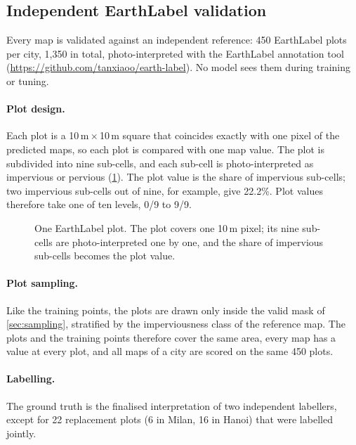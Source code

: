 \subsection{Independent EarthLabel validation}
\label{sec:validation}

Every map is validated against an independent reference: 450 EarthLabel
plots per city, 1{,}350 in total, photo-interpreted with the EarthLabel
annotation tool (\url{https://github.com/tanxiaoo/earth-label}). No model
sees them during training or tuning.

\paragraph{Plot design.} Each plot is a 10\,m\,$\times$\,10\,m square that
coincides exactly with one pixel of the predicted maps, so each plot is
compared with one map value. The plot is subdivided into nine sub-cells, and
each sub-cell is photo-interpreted as impervious or pervious
(\cref{fig:earthlabel}). The plot value is the share of impervious
sub-cells; two impervious sub-cells out of nine, for example, give 22.2\%.
Plot values therefore take one of ten levels, 0/9 to 9/9.

\begin{figure}[htbp]
  \centering
  \caption{One EarthLabel plot. The plot covers one 10\,m pixel; its nine
  sub-cells are photo-interpreted one by one, and the share of impervious
  sub-cells becomes the plot value.}
  \label{fig:earthlabel}
\end{figure}

\paragraph{Plot sampling.} Like the training points, the plots are drawn
only inside the valid mask of \cref{sec:sampling}, stratified by the
imperviousness class of the reference map. The plots and the training points
therefore cover the same area, every map has a value at every plot, and all
maps of a city are scored on the same 450 plots.

\paragraph{Labelling.} The ground truth is the finalised interpretation of
two independent labellers, except for 22 replacement plots (6 in Milan, 16
in Hanoi) that were labelled jointly.


